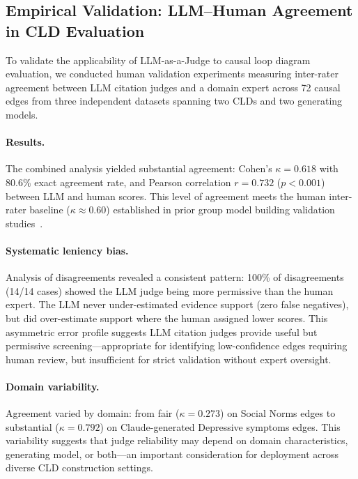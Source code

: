 \subsection{Empirical Validation: LLM--Human Agreement in CLD Evaluation}
\label{sec:discussion_judge_human_agreement}

To validate the applicability of LLM-as-a-Judge to causal loop diagram evaluation, we conducted human validation experiments measuring inter-rater agreement between LLM citation judges and a domain expert across 72 causal edges from three independent datasets spanning two CLDs and two generating models.

\paragraph{Results.} The combined analysis yielded substantial agreement: Cohen's $\kappa = 0.618$ with 80.6\% exact agreement rate, and Pearson correlation $r = 0.732$ ($p < 0.001$) between LLM and human scores. This level of agreement meets the human inter-rater baseline ($\kappa \approx 0.60$) established in prior group model building validation studies~\citep{landis1977measurement}.

\paragraph{Systematic leniency bias.} Analysis of disagreements revealed a consistent pattern: 100\% of disagreements (14/14 cases) showed the LLM judge being more permissive than the human expert. The LLM never under-estimated evidence support (zero false negatives), but did over-estimate support where the human assigned lower scores. This asymmetric error profile suggests LLM citation judges provide useful but permissive screening---appropriate for identifying low-confidence edges requiring human review, but insufficient for strict validation without expert oversight.

\paragraph{Domain variability.} Agreement varied by domain: from fair ($\kappa = 0.273$) on Social Norms edges to substantial ($\kappa = 0.792$) on Claude-generated Depressive symptoms edges. This variability suggests that judge reliability may depend on domain characteristics, generating model, or both---an important consideration for deployment across diverse CLD construction settings.

